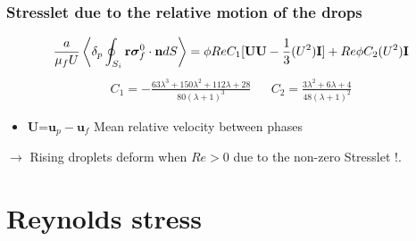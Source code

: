 \documentclass{sintefbeamer}
\begin{document}

\begin{frame}
  \frametitle{Stresslet due to the relative motion of the drops}


  \begin{equation*}
    \frac{a}{\mu_f U}
        \left<\delta_p \oint_{S_{i}} \textbf{r}\bm{\sigma}_f^0 \cdot \textbf{n} dS\right>
    =
    \phi Re C_1
    [
      \textbf{UU} - \frac{1}{3}(U^2)\textbf{I} 
      ]
      + Re \phi C_2 (U^2) \textbf{I}
  \end{equation*} 
\begin{align*}
    C_1  =  -\frac{63 \lambda^{3} + 150 \lambda^{2} + 112 \lambda + 28}{80 \left(\lambda + 1\right)^{3}}
    &&
    C_2  = \frac{3\lambda^2 + 6\lambda + 4}{48(\lambda +1 )^2}
  \end{align*}
  
  \begin{itemize}
    \item \textbf{U}=$\textbf{u}_p-\textbf{u}_f$ Mean relative velocity between phases
  \end{itemize}
  $\to$ Rising droplets deform when $Re > 0$ due to the non-zero Stresslet !. 

\end{frame}

\section{Reynolds stress}
\section*{}
\end{document}
